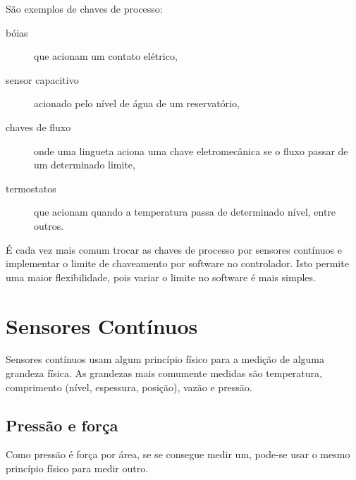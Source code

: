 São exemplos de chaves de processo:
\begin{description}
  \item[bóias] que acionam um contato elétrico,
  \item[sensor capacitivo] acionado pelo nível de água de um reservatório,
  \item[chaves de fluxo] onde uma lingueta aciona uma chave eletromecânica se o fluxo passar de um  determinado limite,
  \item[termostatos] que acionam quando a temperatura passa de determinado nível, entre outros.
\end{description}

É cada vez mais comum trocar as chaves de processo por sensores contínuos e implementar o limite de chaveamento por software no controlador. Isto permite uma maior flexibilidade, pois variar o limite no software é mais simples.

\section{Sensores Contínuos}

Sensores contínuos usam algum princípio físico para a medição de alguma grandeza física. As grandezas mais comumente medidas são temperatura, comprimento (nível, espessura, posição), vazão e pressão.

\subsection{Pressão e força}
\label{sub:Pressão e força}
Como pressão é força por área, se se consegue medir um, pode-se usar o mesmo princípio físico para medir outro.

